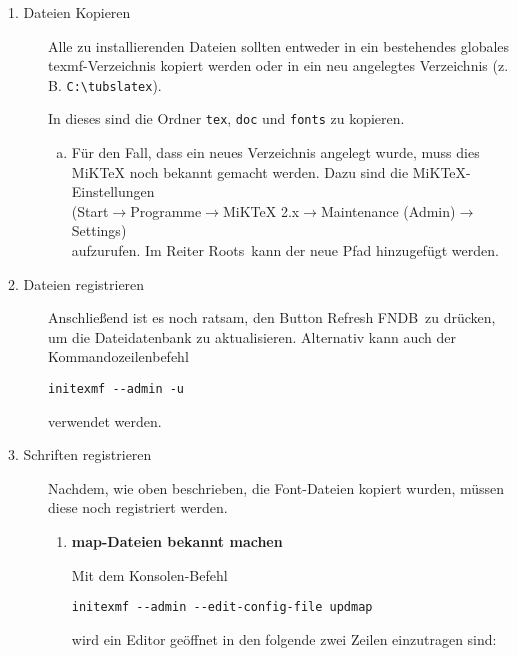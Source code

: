 \begin{description}
  \item[1. Dateien Kopieren]
  
    Alle zu installierenden Dateien sollten entweder in ein bestehendes globales
    texmf-Verzeichnis kopiert werden oder in ein neu angelegtes Verzeichnis
    (z.\,B. \lstinline{C:\tubslatex}).
    
    In dieses sind die Ordner \lstinline{tex}, \lstinline{doc} und 
    \lstinline{fonts} zu kopieren.
    
    \begin{enumerate}[a)]
      \item {\bfseries }
        
        Für den Fall, dass ein neues Verzeichnis angelegt wurde,
        muss dies MiKTeX noch bekannt gemacht werden.
        Dazu sind die MiKTeX-Einstellungen\\
        {\sffamily(Start$\to$Programme$\to$MiKTeX 2.x$\to$Maintenance (Admin)$\to$Settings)\\
        }
        aufzurufen.
        Im Reiter \glqq Roots\grqq\ kann der neue Pfad hinzugefügt werden.
    \end{enumerate}

  \item[2. Dateien registrieren]

    Anschließend ist es noch ratsam, den Button \glqq Refresh FNDB\grqq\
    zu drücken, um die Dateidatenbank zu aktualisieren. Alternativ kann auch 
    der Kommandozeilenbefehl
    \begin{lstlisting}[style=cmd]
initexmf --admin -u
    \end{lstlisting}
     verwendet werden.

  \item[3. Schriften registrieren]
    Nachdem, wie oben beschrieben, die Font-Dateien kopiert wurden, müssen
    diese noch registriert werden.

    \begin{enumerate}

      \item {\bfseries map-Dateien bekannt machen}

      Mit dem Konsolen-Befehl
      \begin{lstlisting}[style=cmd]
initexmf --admin --edit-config-file updmap
      \end{lstlisting}
      wird ein Editor geöffnet in den folgende zwei Zeilen einzutragen sind:


\end{enumerate}
\end{description}
